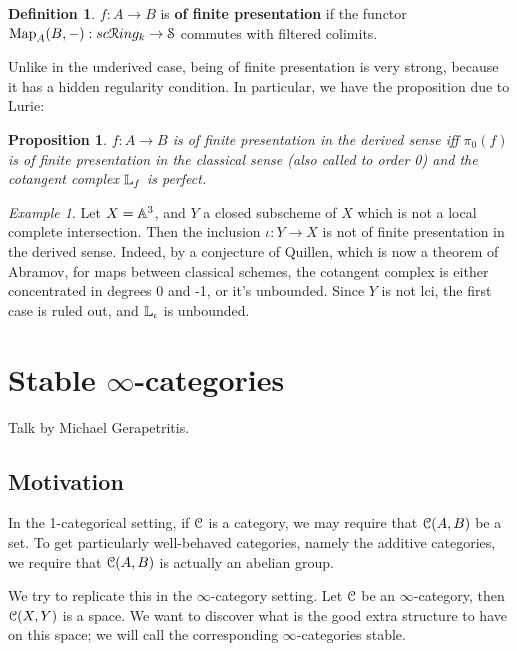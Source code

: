 \documentclass[10pt,a4paper,reqno,oneside]{book} %
\theoremstyle{plain}
\newtheorem{prop}[thm]{Proposition}
\theoremstyle{definition}
\newtheorem{defin}[thm]{Definition}
\theoremstyle{remark}
\newtheorem{eg}[thm]{Example}
\numberwithin{equation}{section}
\begin{document}
\begin{defin}
$f:A \to B$ is \textbf{of finite presentation} if the functor $\operatorname{Map}_A(B, - ) : sc\mathcal R ing_k \to \mathcal S$ commutes with
filtered colimits. 
\end{defin}

Unlike in the underived case, being of finite presentation is very strong, because it has a hidden regularity condition.
In particular, we have the proposition due to Lurie:

\begin{prop}
$f: A \to B$ is of finite presentation in the derived sense iff $\pi_0(f)$ is of finite presentation in the classical sense
(also called to order 0) and the cotangent complex $\mathbb L_f$ is perfect.
\end{prop}

\begin{eg}
Let $X = \mathbb A^3$, and $Y$ a closed subscheme of $X$ which is not a local complete intersection. 
Then the inclusion $\iota :Y \to X$ is not of finite presentation in the derived sense.
Indeed, by a conjecture of Quillen, which is now a theorem of Abramov, for maps between classical schemes, the cotangent 
complex is either concentrated in degrees 0 and -1, or it's unbounded. Since $Y$ is not lci, the first case is ruled out,
and $\mathbb L_{\iota}$ is unbounded.
\end{eg}





\chapter{Stable $\infty$-categories}
Talk by Michael Gerapetritis.

\section{Motivation}
\label{sect:motivation}

In the 1-categorical setting, if $\mathcal C$ is a category, we may require that $\mathcal C(A,B)$ be a set. 
To get particularly well-behaved categories, namely the additive categories, we require that $\mathcal C(A,B)$ is actually
an abelian group. 

We try to replicate this in the $\infty$-category setting.
Let $\mathcal C$ be an $\infty$-category, then $\mathcal C(X,Y)$ is a space. We want to discover what is the good extra structure to have on 
this space; we will call the corresponding $\infty$-categories stable.
\end{document}
